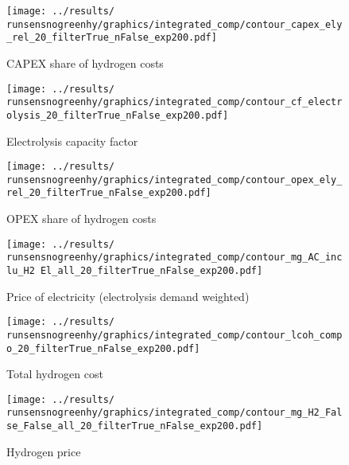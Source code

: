\begin{figure*}[h!]
    \centering
    \begin{subfigure}[b]{0.45\linewidth}
        \centering
        \texttt{[image: ../results/\\runsensnogreenhy/graphics/integrated\_comp/contour\_capex\_ely\_rel\_20\_filterTrue\_nFalse\_exp200.pdf]}
        \caption{CAPEX share of hydrogen costs}
        \label{fig:capex-rel-norule}
    \end{subfigure}
    \hfill
    \begin{subfigure}[b]{0.45\linewidth}
        \centering
        \texttt{[image: ../results/\\runsensnogreenhy/graphics/integrated\_comp/contour\_cf\_electrolysis\_20\_filterTrue\_nFalse\_exp200.pdf]}
        \caption{Electrolysis capacity factor}
        \label{fig:ely-cf-norule}
    \end{subfigure}
    \hfill
    \begin{subfigure}[b]{0.45\linewidth}
        \centering
        \texttt{[image: ../results/\\runsensnogreenhy/graphics/integrated\_comp/contour\_opex\_ely\_rel\_20\_filterTrue\_nFalse\_exp200.pdf]}
        \caption{OPEX share of hydrogen costs}
        \label{fig:opex-rel-norule}
    \end{subfigure}
    \hfill
    \begin{subfigure}[b]{0.45\linewidth}
        \centering
        \texttt{[image: ../results/\\runsensnogreenhy/graphics/integrated\_comp/contour\_mg\_AC\_inclu\_H2 El\_all\_20\_filterTrue\_nFalse\_exp200.pdf]}
        \caption{Price of electricity (electrolysis demand weighted)}
        \label{fig:electricity-price-norule}
    \end{subfigure}
    \hfill
    \begin{subfigure}[b]{0.45\linewidth}
        \centering
        \texttt{[image: ../results/\\runsensnogreenhy/graphics/integrated\_comp/contour\_lcoh\_compo\_20\_filterTrue\_nFalse\_exp200.pdf]}
        \caption{Total hydrogen cost}
        \label{fig:hydrogen-cost-norule}
    \end{subfigure}
    \hfill
    \begin{subfigure}[b]{0.45\linewidth}
        \centering
        \texttt{[image: ../results/\\runsensnogreenhy/graphics/integrated\_comp/contour\_mg\_H2\_False\_False\_all\_20\_filterTrue\_nFalse\_exp200.pdf]}
        \caption{Hydrogen price}
        \label{fig:hydrogen-price-norule}
    \end{subfigure}
    \hfill
    

\end{figure*}
